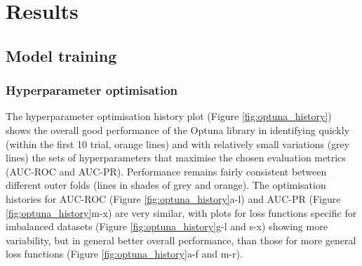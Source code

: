 \section{Results}
\label{data_driven_flash_floods_short_medium_range_results}

\subsection{Model training}

\subsubsection{Hyperparameter optimisation}

The hyperparameter optimisation history plot (Figure \ref{fig:optuna_history}) shows the overall good performance of the Optuna library in identifying quickly (within the first 10 trial, orange lines) and with relatively small variations (grey lines) the sets of hyperparameters that maximise the chosen evaluation metrics (AUC-ROC and AUC-PR). Performance remains fairly consistent between different outer folds (lines in shades of grey and orange). The optimisation histories for AUC-ROC (Figure \ref{fig:optuna_history}a-l) and AUC-PR (Figure \ref{fig:optuna_history}m-x) are very similar, with plots for loss functions specific for imbalanced datasets (Figure \ref{fig:optuna_history}g-l and s-x) showing more variability, but in general better overall performance, than those for more general loss functions (Figure \ref{fig:optuna_history}a-f and m-r). 

